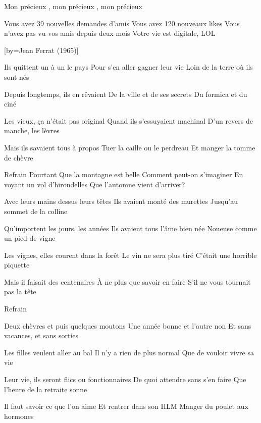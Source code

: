 \beginverse
Mon précieux , mon précieux , mon précieux \\[4x]
\endverse

\beginverse
Vous avez 39 nouvelles demandes d'amis
Vous avez 120 nouveaux likes
Vous n'avez pas vu vos amis depuis deux mois
Votre vie est digitale, LOL
\endverse

[by={Jean Ferrat (1965)}]

\beginverse
Ils quittent un à un le pays
Pour s'en aller gagner leur vie
Loin de la terre où ils sont nés
\endverse

\beginverse
Depuis longtemps, ils en rêvaient
De la ville et de ses secrets
Du formica et du ciné
\endverse

\beginverse
Les vieux, ça n'était pas original
Quand ils s'essuyaient machinal
D'un revers de manche, les lèvres
\endverse

\beginverse
Mais ils savaient tous à propos
Tuer la caille ou le perdreau
Et manger la tomme de chèvre
\endverse

\beginverse
Refrain
Pourtant
Que la montagne est belle
Comment peut-on s'imaginer
En voyant un vol d'hirondelles
Que l'automne vient d'arriver?
\endverse

\beginverse
Avec leurs mains dessus leurs têtes
Ils avaient monté des murettes
Jusqu'au sommet de la colline
\endverse

\beginverse
Qu'importent les jours, les années
Ils avaient tous l'âme bien née
Noueuse comme un pied de vigne
\endverse

\beginverse
Les vignes, elles courent dans la forêt
Le vin ne sera plus tiré
C'était une horrible piquette
\endverse

\beginverse
Mais il faisait des centenaires
À ne plus que savoir en faire
S'il ne vous tournait pas la tête
\endverse

\beginverse
Refrain
\endverse

\beginverse
Deux chèvres et puis quelques moutons
Une année bonne et l'autre non
Et sans vacances, et sans sorties
\endverse

\beginverse
Les filles veulent aller au bal
Il n'y a rien de plus normal
Que de vouloir vivre sa vie
\endverse

\beginverse
Leur vie, ils seront flics ou fonctionnaires
De quoi attendre sans s'en faire
Que l'heure de la retraite sonne
\endverse

\beginverse
Il faut savoir ce que l'on aime
Et rentrer dans son HLM
Manger du poulet aux hormones
\endverse

